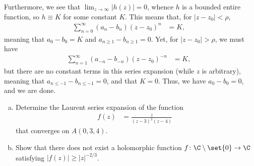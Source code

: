 \documentclass[11pt]{mypackage}
\begin{document}
\begin{solution}
  Furthermore, we see that $\lim_{z\rightarrow\infty} \left\vert h(z) \right\vert = 0$, whence $h$ is a bounded entire function, so $h\equiv K$ for some constant $K$. This means that, for $\left\vert z-z_0 \right\vert < \rho$,
  \begin{align*}
    \sum_{n=0}^{\infty}\left( a_n-b_n \right)\left( z-z_0 \right)^{n} &= K,
  \end{align*}
  meaning that $a_0-b_0 = K$ and $a_{n\geq 1} - b_{n\geq 1} = 0$. Yet, for $\left\vert z-z_0 \right\vert > \rho$, we must have
  \begin{align*}
    \sum_{n=1}^{\infty}\left( a_{-n}-b_{-n} \right) \left( z-z_0 \right)^{-n} &= K,
  \end{align*}
  but there are no constant terms in this series expansion (while $z$ is arbitrary), meaning that $a_{n \leq -1} - b_{n \leq -1} = 0$, and that $K = 0$. Thus, we have $a_0 - b_0 = 0$, and we are done.
\end{solution}
\begin{problem}[Problem 2]\hfill
  \begin{enumerate}[(a)]
    \item Determine the Laurent series expansion of the function
      \begin{align*}
        f(z) &= \frac{z}{\left( z-3 \right)^2\left( z-4 \right)}
      \end{align*}
      that converges on $A\left( 0,3,4 \right)$. 
    \item Show that there does not exist a holomorphic function $f\colon \C\setminus \set{0}\rightarrow \C$ satisfying $ \left\vert f(z) \right\vert\geq \left\vert z \right\vert^{-2/3} $.
  \end{enumerate}
\end{problem}
\end{document}
